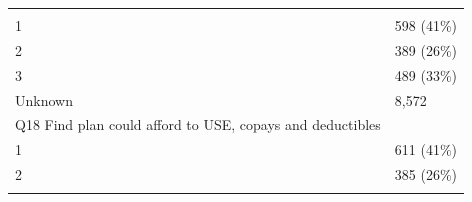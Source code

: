 \documentclass[]{article}
\begin{document}
\begin{longtable}[]{@{}ll@{}}
\begin{minipage}[t]{0.71\columnwidth}
\end{minipage} & \begin{minipage}[t]{0.23\columnwidth}\raggedright
\strut
\end{minipage}\tabularnewline
\begin{minipage}[t]{0.71\columnwidth}\raggedright
1\strut
\end{minipage} & \begin{minipage}[t]{0.23\columnwidth}\raggedright
598 (41\%)\strut
\end{minipage}\tabularnewline
\begin{minipage}[t]{0.71\columnwidth}\raggedright
2\strut
\end{minipage} & \begin{minipage}[t]{0.23\columnwidth}\raggedright
389 (26\%)\strut
\end{minipage}\tabularnewline
\begin{minipage}[t]{0.71\columnwidth}\raggedright
3\strut
\end{minipage} & \begin{minipage}[t]{0.23\columnwidth}\raggedright
489 (33\%)\strut
\end{minipage}\tabularnewline
\begin{minipage}[t]{0.71\columnwidth}\raggedright
Unknown\strut
\end{minipage} & \begin{minipage}[t]{0.23\columnwidth}\raggedright
8,572\strut
\end{minipage}\tabularnewline
\begin{minipage}[t]{0.71\columnwidth}\raggedright
Q18 Find plan could afford to USE, copays and deductibles\strut
\end{minipage} & \begin{minipage}[t]{0.23\columnwidth}\raggedright
\strut
\end{minipage}\tabularnewline
\begin{minipage}[t]{0.71\columnwidth}\raggedright
1\strut
\end{minipage} & \begin{minipage}[t]{0.23\columnwidth}\raggedright
611 (41\%)\strut
\end{minipage}\tabularnewline
\begin{minipage}[t]{0.71\columnwidth}\raggedright
2\strut
\end{minipage} & \begin{minipage}[t]{0.23\columnwidth}\raggedright
385 (26\%)\strut
\end{minipage}\tabularnewline
\begin{minipage}[t]{0.71\columnwidth}\raggedright

\end{minipage}
\end{longtable}
\end{document}

